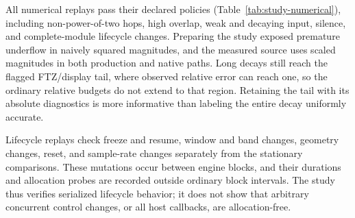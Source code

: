 All numerical replays pass their declared policies
(Table~\ref{tab:study-numerical}), including non-power-of-two hops, high
overlap, weak and decaying input, silence, and complete-module lifecycle
changes. Preparing the study exposed premature underflow in naively squared
magnitudes, and the measured source uses scaled magnitudes in both production
and native paths. Long decays still reach the flagged FTZ/display tail, where
observed relative error can reach one, so the ordinary relative budgets do not
extend to that region. Retaining the tail with its absolute diagnostics is
more informative than labeling the entire decay uniformly accurate.



Lifecycle replays check freeze and resume, window and band changes, geometry
changes, reset, and sample-rate changes separately from the stationary
comparisons. These mutations occur between engine blocks, and their durations
and allocation probes are recorded outside ordinary block intervals. The study
thus verifies serialized lifecycle behavior; it does not show that arbitrary
concurrent control changes, or all host callbacks, are allocation-free.
